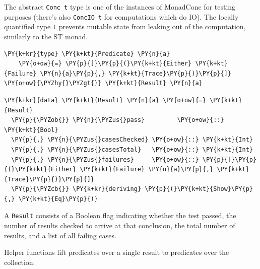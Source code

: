 The abstract \texttt{Conc t} type is one of the instances of MonadConc
for testing purposes (there's also \texttt{ConcIO t} for computations
which do IO). The locally quantified type \texttt{t} prevents mutable
state from leaking out of the computation, similarly to the ST monad.


\begin{Verbatim}[commandchars=\\\{\}]
\PY{k+kr}{type} \PY{k+kt}{Predicate} \PY{n}{a}
    \PY{o+ow}{=} \PY{p}{[}\PY{p}{(}\PY{k+kt}{Either} \PY{k+kt}{Failure} \PY{n}{a}\PY{p}{,} \PY{k+kt}{Trace}\PY{p}{)}\PY{p}{]} \PY{o+ow}{\PYZhy{}\PYZgt{}} \PY{k+kt}{Result} \PY{n}{a}
\end{Verbatim}
\begin{Verbatim}[commandchars=\\\{\}]
\PY{k+kr}{data} \PY{k+kt}{Result} \PY{n}{a} \PY{o+ow}{=} \PY{k+kt}{Result}
  \PY{p}{\PYZob{}} \PY{n}{\PYZus{}pass}         \PY{o+ow}{::} \PY{k+kt}{Bool}
  \PY{p}{,} \PY{n}{\PYZus{}casesChecked} \PY{o+ow}{::} \PY{k+kt}{Int}
  \PY{p}{,} \PY{n}{\PYZus{}casesTotal}   \PY{o+ow}{::} \PY{k+kt}{Int}
  \PY{p}{,} \PY{n}{\PYZus{}failures}     \PY{o+ow}{::} \PY{p}{[}\PY{p}{(}\PY{k+kt}{Either} \PY{k+kt}{Failure} \PY{n}{a}\PY{p}{,} \PY{k+kt}{Trace}\PY{p}{)}\PY{p}{]}
  \PY{p}{\PYZcb{}} \PY{k+kr}{deriving} \PY{p}{(}\PY{k+kt}{Show}\PY{p}{,} \PY{k+kt}{Eq}\PY{p}{)}
\end{Verbatim}

A \texttt{Result} consists of a Boolean flag indicating whether the
test passed, the number of results checked to arrive at that
conclusion, the total number of results, and a list of all failing
cases.

Helper functions lift predicates over a single result to predicates
over the collection:


